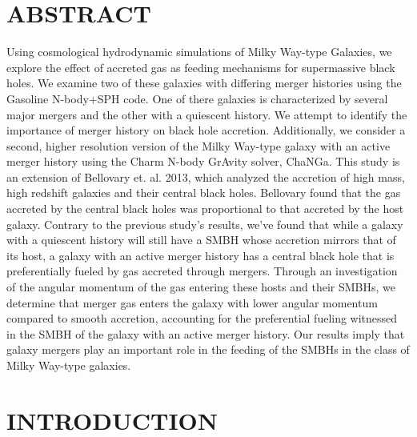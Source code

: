 \documentclass[12pt,headA,chapB]{fiskthesis}
\begin{document}


\newpage
{}
\listoffigures
\thispagestyle{fancy}


\newpage
{}
\chapter*{\normalsize ABSTRACT}
\thispagestyle{empty}
\rhead{\small\thepage}
Using cosmological hydrodynamic simulations of Milky Way-type Galaxies, we explore the effect of accreted gas as feeding mechanisms for supermassive black holes. We examine two of these galaxies with differing merger histories using the Gasoline N-body+SPH code. One of there galaxies is characterized by several major mergers and the other with a quiescent history. We attempt to identify the importance of merger history on black hole accretion. Additionally, we consider a second, higher resolution version of the Milky Way-type galaxy with an active merger history using the Charm N-body GrAvity solver, ChaNGa.  This study is an extension of Bellovary et. al. 2013, which analyzed the accretion of high mass, high redshift galaxies and their central black holes. Bellovary found that the gas accreted by the central black holes was proportional to that accreted by the host galaxy. Contrary to the previous study's results, we've found that while a galaxy with a quiescent history will still have a SMBH whose accretion mirrors that of its host, a galaxy with an active merger history has a central black hole that is preferentially fueled by gas accreted through mergers. Through an investigation of the angular momentum of the gas entering these hosts and their SMBHs, we determine that merger gas enters the galaxy with lower angular momentum compared to smooth accretion, accounting for the preferential fueling witnessed in the SMBH of the galaxy with an active merger history. Our results imply that galaxy mergers play an important role in the feeding of the SMBHs in the class of Milky Way-type galaxies.
\vspace{4ex}


\mainmatter
\chapter{\normalsize INTRODUCTION}
\end{document}
